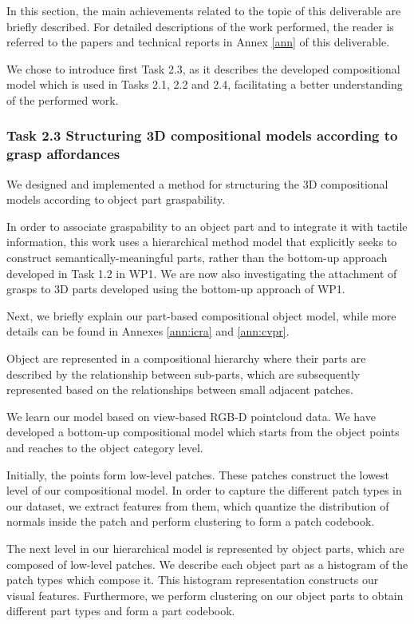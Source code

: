 \documentclass[a4paper,11pt,pdf]{../templates/pacmanreport}
\begin{document}
In this section, the main achievements related to the topic of this deliverable are briefly described. For detailed descriptions of the work performed, the reader is referred to the papers and technical reports in Annex \ref{ann} of this deliverable.

We chose to introduce first Task 2.3, as it describes the developed compositional model which is used in Tasks 2.1, 2.2 and 2.4, facilitating a better understanding of the performed work.

\subsubsection{Task 2.3 Structuring 3D compositional models according to grasp affordances}

We designed and implemented a method for structuring the 3D compositional models according to object part graspability.

In order to associate graspability to an object part and to integrate it with tactile information, this work uses a hierarchical method model that explicitly seeks to construct semantically-meaningful parts, rather than the bottom-up approach developed in Task 1.2 in WP1. We are now also investigating the attachment of grasps to 3D parts developed using the bottom-up approach of WP1.

Next, we briefly explain our part-based compositional object model, while more details can be found in Annexes \ref{ann:icra} and \ref{ann:cvpr}. 

Object are represented in a compositional hierarchy where their parts are described by the relationship between sub-parts, which are subsequently represented based on the relationships between small adjacent patches. 

We learn our model based on view-based RGB-D pointcloud data. We have developed a bottom-up compositional model which starts from the object points and reaches to the object category level.

Initially, the points form low-level patches. These patches construct the lowest level of our compositional model. In order to capture the different patch types in our dataset, we extract features from them, which quantize the distribution of normals inside the patch and
perform clustering to form a patch codebook.

The next level in our hierarchical model is represented by object parts, which are composed of low-level patches. We describe each object part as a histogram of the patch types which compose it. This histogram representation constructs our visual features. Furthermore, we perform clustering on our object parts to obtain different part types and form a part codebook.
\end{document}

